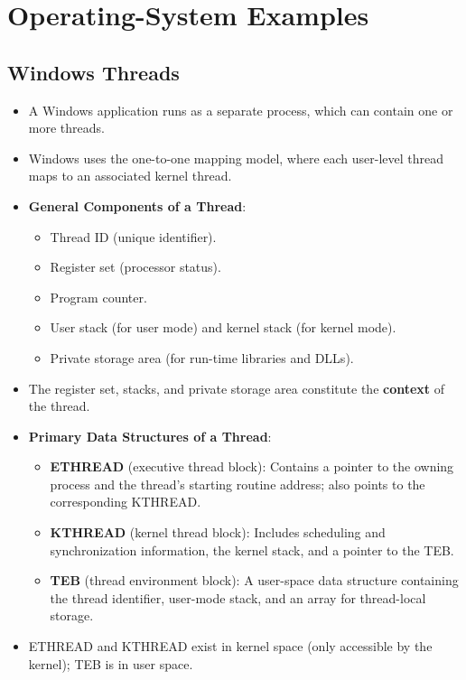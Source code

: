 \section{Operating-System Examples}\label{sec:4.7}

\subsection{Windows Threads}
\begin{itemize}
    \item A Windows application runs as a separate process, which can contain one or more threads.
    \item Windows uses the one-to-one mapping model, where each user-level thread maps to an associated kernel thread.
    \item \textbf{General Components of a Thread}:
        \begin{itemize}
            \item Thread ID (unique identifier).
            \item Register set (processor status).
            \item Program counter.
            \item User stack (for user mode) and kernel stack (for kernel mode).
            \item Private storage area (for run-time libraries and DLLs).
        \end{itemize}
    \item The register set, stacks, and private storage area constitute the \textbf{context} of the thread.
    \item \textbf{Primary Data Structures of a Thread}:
        \begin{itemize}
            \item \textbf{ETHREAD} (executive thread block): Contains a pointer to the owning process and the thread's starting routine address; also points to the corresponding KTHREAD.
            \item \textbf{KTHREAD} (kernel thread block): Includes scheduling and synchronization information, the kernel stack, and a pointer to the TEB.
            \item \textbf{TEB} (thread environment block): A user-space data structure containing the thread identifier, user-mode stack, and an array for thread-local storage.
        \end{itemize}
    \item ETHREAD and KTHREAD exist in kernel space (only accessible by the kernel); TEB is in user space.
\end{itemize}

